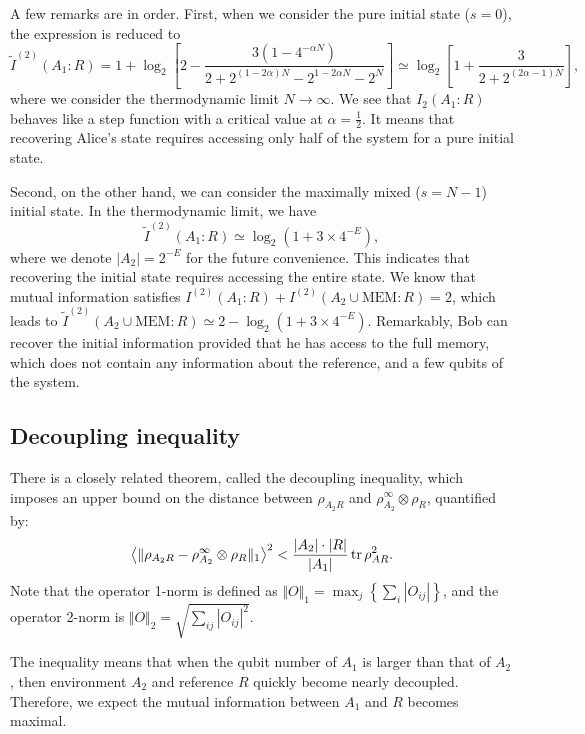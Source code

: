 \documentclass{SciPost}
\begin{document}
A few remarks are in order.
First, when we consider the pure initial state ($s=0$), the expression is reduced to
\begin{equation}
	\tilde I^{(2)}(A_1: R)
	= 1 + \log_2 \left[ 2 - \frac{3(1-4^{-\alpha N})}{2 + 2^{(1-2\alpha)N}-2^{1-2\alpha N}-2^N} \right] 
	\simeq \log_2\left[1 + \frac{3}{2 + 2^{(2\alpha-1)N}}\right],
\end{equation}
where we consider the thermodynamic limit $N\rightarrow \infty$.
We see that $I_2(A_1:R)$ behaves like a step function with a critical value at $\alpha=\frac{1}{2}$.
It means that recovering Alice's state requires accessing only half of the system for a pure initial state.

Second, on the other hand, we can consider the maximally mixed ($s=N-1$) initial state. 
In the thermodynamic limit, we have
\begin{equation}
	\tilde I^{(2)}(A_1:R) \simeq \log_2\left(1+3\times 4^{-E}\right),
\end{equation}
where we denote $|A_2| = 2^{-E}$ for the future convenience.
This indicates that recovering the initial state requires accessing the entire state.
We know that mutual information satisfies $I^{(2)}(A_1:R) + I^{(2)}(A_2\cup\mathrm{MEM}:R) = 2$, which leads to $\tilde I^{(2)}(A_2\cup\mathrm{MEM}:R) \simeq 2 - \log_2(1+3\times 4^{-E})$.
Remarkably, Bob can recover the initial information provided that he has access to the full memory, which does not contain any information about the reference, and a few qubits of the system.


\subsection{Decoupling inequality}
There is a closely related theorem, called the decoupling inequality, which imposes an upper bound on the distance between $\rho_{A_2R}$ and $\rho_{A_2}^\infty\otimes\rho_R$, quantified by:
\begin{equation}
	\left\langle\|\rho_{A_2 R}-\rho^\infty_{A_2}\otimes \rho_R\|_1\right\rangle^2
	< \frac{|A_2|\cdot|R|}{|A_1|}\operatorname{tr}\rho_{AR}^2.
\end{equation}
Note that the operator 1-norm is defined as $\Vert O \Vert_1 = \max_j\left\{\sum_i|O_{ij}|\right\}$, and the operator 2-norm is $\Vert O \Vert_2 = \sqrt{\sum_{ij}|O_{ij}|^2}$.

The inequality means that when the qubit number of $A_1$ is larger than that of $A_2$, then environment $A_2$ and reference $R$ quickly become nearly decoupled.
Therefore, we expect the mutual information between $A_1$ and $R$ becomes maximal.
\end{document}
